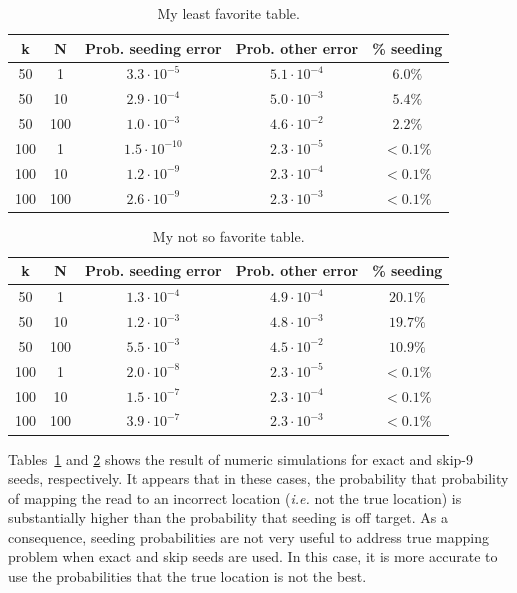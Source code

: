 \documentclass{article}
\begin{document}
\begin{table}
\renewcommand{\arraystretch}{1.1}
\centering
\begin{tabular}{ccccc}
k & N & Prob. seeding error & Prob. other error & \% seeding \\
\hline
50  &  1  & $3.3 \cdot 10^{-5}$  & $5.1 \cdot 10^{-4}$ & $6.0\%$ \\
50  & 10  & $2.9 \cdot 10^{-4}$  & $5.0 \cdot 10^{-3}$ & $5.4\%$ \\
50  & 100 & $1.0 \cdot 10^{-3}$  & $4.6 \cdot 10^{-2}$ & $2.2\%$ \\
100 &  1  & $1.5 \cdot 10^{-10}$ & $2.3 \cdot 10^{-5}$ & $< 0.1\%$ \\
100 & 10  & $1.2 \cdot 10^{-9}$  & $2.3 \cdot 10^{-4}$ & $< 0.1\%$ \\
100 & 100 & $2.6 \cdot 10^{-9}$  & $2.3 \cdot 10^{-3}$ & $< 0.1\%$
\end{tabular}
\caption{My least favorite table.}
\label{table_exact}
\end{table}

\begin{table}
\renewcommand{\arraystretch}{1.1}
\centering
\begin{tabular}{ccccc}
k & N & Prob. seeding error & Prob. other error & \% seeding \\
\hline
50  &  1  & $1.3 \cdot 10^{-4}$ & $4.9 \cdot 10^{-4}$ & $20.1\%$ \\
50  & 10  & $1.2 \cdot 10^{-3}$ & $4.8 \cdot 10^{-3}$ & $19.7\%$ \\
50  & 100 & $5.5 \cdot 10^{-3}$ & $4.5 \cdot 10^{-2}$ & $10.9\%$ \\
100 &  1  & $2.0 \cdot 10^{-8}$ & $2.3 \cdot 10^{-5}$ & $< 0.1\%$ \\
100 & 10  & $1.5 \cdot 10^{-7}$ & $2.3 \cdot 10^{-4}$ & $< 0.1\%$ \\
100 & 100 & $3.9 \cdot 10^{-7}$ & $2.3 \cdot 10^{-3}$ & $< 0.1\%$
\end{tabular}
\caption{My not so favorite table.}
\label{table_skip}
\end{table}

Tables~\ref{table_exact} and \ref{table_skip} shows the result of numeric
simulations for exact and skip-9 seeds, respectively. It appears that in
these cases, the probability that probability of mapping the read to an
incorrect location (\textit{i.e.} not the true location) is substantially
higher than the probability that seeding is off target. As a consequence,
seeding probabilities are not very useful to address true mapping problem
when exact and skip seeds are used. In this case, it is more accurate to
use the probabilities that the true location is not the best.
\end{document}
